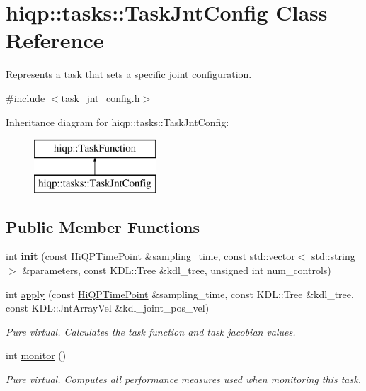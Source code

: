 \hypertarget{classhiqp_1_1tasks_1_1TaskJntConfig}{\section{hiqp\-:\-:tasks\-:\-:Task\-Jnt\-Config Class Reference}
\label{classhiqp_1_1tasks_1_1TaskJntConfig}
}


Represents a task that sets a specific joint configuration.  




{\ttfamily \#include $<$task\-\_\-jnt\-\_\-config.\-h$>$}

Inheritance diagram for hiqp\-:\-:tasks\-:\-:Task\-Jnt\-Config\-:\begin{figure}[H]
\begin{center}
\leavevmode
\includegraphics[height=2.000000cm]{classhiqp_1_1tasks_1_1TaskJntConfig}
\end{center}
\end{figure}
\subsection*{Public Member Functions}
\begin{DoxyCompactItemize}
\item 
\hypertarget{classhiqp_1_1tasks_1_1TaskJntConfig_a8f4832644750dc2020ec22d8024b8528}{int {\bfseries init} (const \hyperlink{classhiqp_1_1HiQPTimePoint}{Hi\-Q\-P\-Time\-Point} \&sampling\-\_\-time, const std\-::vector$<$ std\-::string $>$ \&parameters, const K\-D\-L\-::\-Tree \&kdl\-\_\-tree, unsigned int num\-\_\-controls)}\label{classhiqp_1_1tasks_1_1TaskJntConfig_a8f4832644750dc2020ec22d8024b8528}

\item 
int \hyperlink{classhiqp_1_1tasks_1_1TaskJntConfig_a5e5ed2b1a16a96fbdaff3e95fd1b2329}{apply} (const \hyperlink{classhiqp_1_1HiQPTimePoint}{Hi\-Q\-P\-Time\-Point} \&sampling\-\_\-time, const K\-D\-L\-::\-Tree \&kdl\-\_\-tree, const K\-D\-L\-::\-Jnt\-Array\-Vel \&kdl\-\_\-joint\-\_\-pos\-\_\-vel)
\begin{DoxyCompactList}\small\item\em {\itshape Pure virtual}. Calculates the task function and task jacobian values. \end{DoxyCompactList}\item 
int \hyperlink{classhiqp_1_1tasks_1_1TaskJntConfig_a903a952db54532a9650c725141399774}{monitor} ()
\begin{DoxyCompactList}\small\item\em {\itshape Pure virtual}. Computes all performance measures used when monitoring this task. \end{DoxyCompactList}\end{DoxyCompactItemize}

